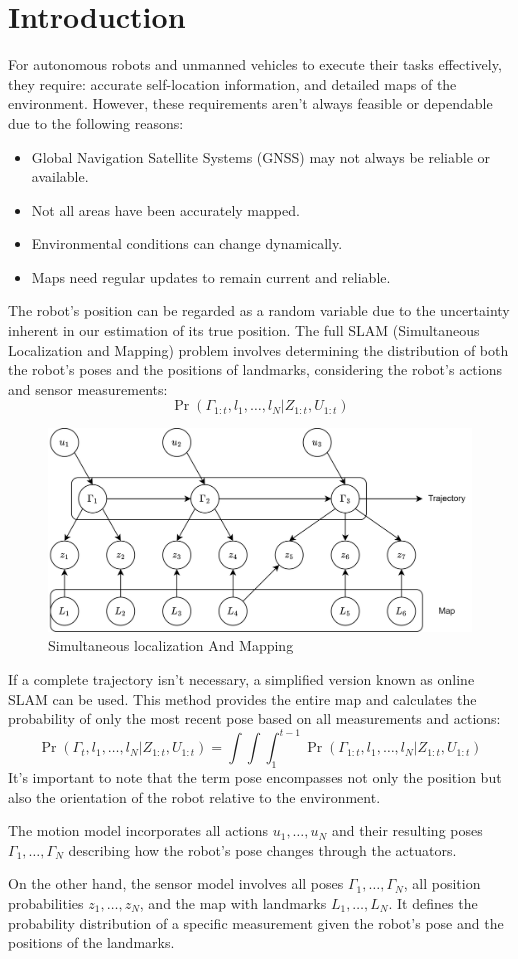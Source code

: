 \section{Introduction}

For autonomous robots and unmanned vehicles to execute their tasks effectively, they require: accurate self-location information, and detailed maps of the environment.
However, these requirements aren't always feasible or dependable due to the following reasons:
\begin{itemize}
    \item Global Navigation Satellite Systems (GNSS) may not always be reliable or available.
    \item Not all areas have been accurately mapped.
    \item Environmental conditions can change dynamically.
    \item Maps need regular updates to remain current and reliable.
\end{itemize}

The robot's position can be regarded as a random variable due to the uncertainty inherent in our estimation of its true position.
The full SLAM (Simultaneous Localization and Mapping) problem involves determining the distribution of both the robot's poses and the positions of landmarks, considering the robot's actions and sensor measurements: 
\[\Pr\left(\Gamma_{1:t},l_1,\dots,l_N|Z_{1:t},U_{1:t}\right)\]
\begin{figure}[H]
    \centering
    \includegraphics[width=0.75\linewidth]{images/slam.png}
    \caption{Simultaneous localization And Mapping}
\end{figure}
If a complete trajectory isn't necessary, a simplified version known as online SLAM can be used. 
This method provides the entire map and calculates the probability of only the most recent pose based on all measurements and actions: 
\[\Pr\left(\Gamma_{t},l_1,\dots,l_N|Z_{1:t},U_{1:t}\right)=\int\int\int_{1}^{t-1}\Pr\left(\Gamma_{1:t},l_1,\dots,l_N|Z_{1:t},U_{1:t}\right)\]
It's important to note that the term pose encompasses not only the position but also the orientation of the robot relative to the environment.

The motion model incorporates all actions $u_1,\dots,u_N$ and their resulting poses $\Gamma_1,\dots,\Gamma_N$ describing how the robot's pose changes through the actuators.

On the other hand, the sensor model involves all poses $\Gamma_1,\dots,\Gamma_N$, all position probabilities $z_1,\dots,z_N$, and the map with landmarks $L_1,\dots,L_N$. 
It defines the probability distribution of a specific measurement given the robot's pose and the positions of the landmarks.